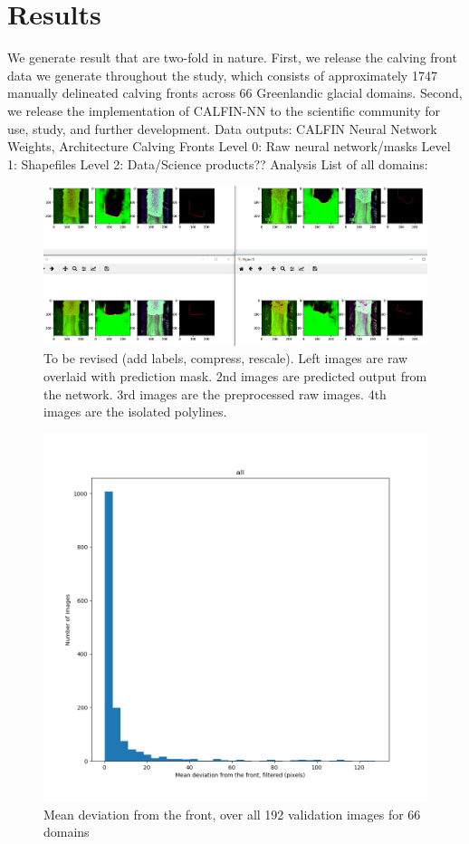 \documentclass[tc, manuscript]{copernicus}
\begin{document}
\section{Results}
We generate result that are two-fold in nature. First, we release the calving front data we generate throughout the study, which consists of approximately 1747 manually delineated calving fronts across 66 Greenlandic glacial domains. Second, we release the implementation of CALFIN-NN to the scientific community for use, study, and further development.
Data outputs:
	CALFIN Neural Network
		Weights, Architecture
	Calving Fronts
        Level 0: Raw neural network/masks
        Level 1: Shapefiles
        Level 2: Data/Science products?? Analysis
List of all domains:

\begin{figure}[t]
\includegraphics[width=18cm]{intercomp.png}
To be revised (add labels, compress, rescale). Left images are raw overlaid with prediction mask.
2nd images are predicted output from the network.
3rd images are the preprocessed raw images.
4th images are the isolated polylines.
\centering
\end{figure}
\begin{figure}[t]
\includegraphics[width=18cm]{all_mean_deviation.png}
Mean deviation from the front, over all 192 validation images for 66 domains
\centering
\end{figure}
\end{document}
